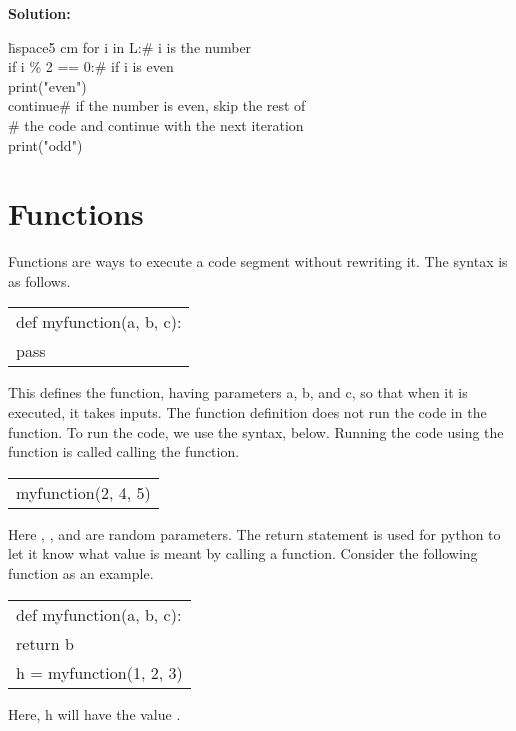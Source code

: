 \documentclass{article}
\newcommand{\icode}[1]{{\ttfamily #1}}
\newenvironment{code}{\begin{tcolorbox}\ttfamily}{\end{tcolorbox}}
\begin{document}
\noindent \textbf{Solution:}
\begin{code}
	\begin{tabbing}
		\hspace{4.5 cm} \= hspace{5 cm} \kill
	for i in L:\>\# i is the number\\
	\hspace{2 em}if i \% 2 == 0:\>\# if i is even\\
	\hspace{4 em}print("even")\\
	\hspace{4 em}continue\>\# if the number is even, skip the rest of \\
	\>\# the code and continue with the next iteration\\
	\hspace{2 em}print("odd")
	\end{tabbing}
\end{code}

\section{Functions}
Functions are ways to execute a code segment without rewriting it. The syntax is as follows.

\begin{center} \ttfamily
	\begin{tabular}{|l}
		def myfunction(a, b, c):\\
		\hspace{2 em}pass
	\end{tabular}
\end{center}
This defines the function, having parameters \icode{a}, \icode{b}, and \icode{c}, so that when it is executed, it takes inputs. The function definition does not run the code in the function. To run the code, we use the syntax, below. Running the code using the function is called calling the function.

\begin{center} \ttfamily
	\begin{tabular}{|l}
		myfunction(2, 4, 5)
	\end{tabular}
\end{center}
Here \icode{2}, \icode{4}, and \icode{5} are random parameters. The \icode{return} statement is used for python to let it know what value is meant by calling a function. Consider the following function as an example.

\begin{center} \ttfamily
	\begin{tabular}{|l}
		def myfunction(a, b, c):\\
		\hspace{2 em}return b\\
		h = myfunction(1, 2, 3)
	\end{tabular}
\end{center}
Here, \icode{h} will have the value \icode{2}.
\end{document}
